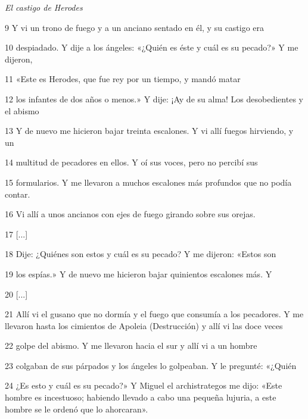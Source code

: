 \par \textit{El castigo de Herodes}

\par 9 Y vi un trono de fuego y a un anciano sentado en él, y su castigo era

\par 10 despiadado. Y dije a los ángeles: «¿Quién es éste y cuál es su pecado?» Y me dijeron,

\par 11 «Este es Herodes, que fue rey por un tiempo, y mandó matar

\par 12 los infantes de dos años o menos.» Y dije: ¡Ay de su alma! Los desobedientes y el abismo

\par 13 Y de nuevo me hicieron bajar treinta escalones. Y vi allí fuegos hirviendo, y un

\par 14 multitud de pecadores en ellos. Y oí sus voces, pero no percibí sus

\par 15 formularios. Y me llevaron a muchos escalones más profundos que no podía contar.

\par 16 Vi allí a unos ancianos con ejes de fuego girando sobre sus orejas.

\par 17 [...]

\par 18 Dije: ¿Quiénes son estos y cuál es su pecado? Y me dijeron: «Estos son

\par 19 los espías.» Y de nuevo me hicieron bajar quinientos escalones más. Y

\par 20 [...]

\par 21 Allí vi el gusano que no dormía y el fuego que consumía a los pecadores. Y me llevaron hasta los cimientos de Apoleia (Destrucción) y allí vi las doce veces

\par 22 golpe del abismo. Y me llevaron hacia el sur y allí vi a un hombre

\par 23 colgaban de sus párpados y los ángeles lo golpeaban. Y le pregunté: «¿Quién

\par 24 ¿Es esto y cuál es su pecado?» Y Miguel el archistrategos me dijo: «Este hombre es incestuoso; habiendo llevado a cabo una pequeña lujuria, a este hombre se le ordenó que lo ahorcaran».


